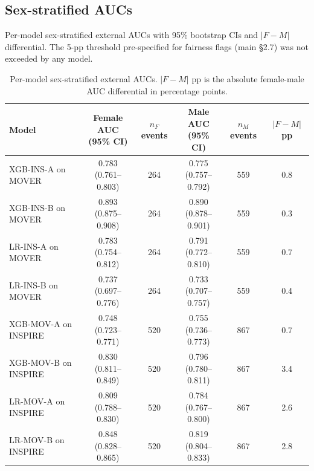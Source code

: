 \documentclass[11pt,a4paper]{article}
\begin{document}
\subsection{Sex-stratified AUCs}\label{supp:s6-sex-stratified}

Per-model sex-stratified external AUCs with 95\% bootstrap CIs and
$|F-M|$ differential. The 5-pp threshold pre-specified for fairness flags
(main \S2.7) was not exceeded by any model.

\begin{table}[H]
\centering
\caption{Per-model sex-stratified external AUCs. $|F-M|$ pp is the absolute
female-male AUC differential in percentage points.}
\label{tab:sensitivities}
\setlength{\tabcolsep}{4pt}
\small
\begin{tabular}{lccccc}
\toprule
\textbf{Model} & \shortstack{\textbf{Female AUC}\\\textbf{(95\% CI)}} & \shortstack{\textbf{$n_F$}\\\textbf{events}} & \shortstack{\textbf{Male AUC}\\\textbf{(95\% CI)}} & \shortstack{\textbf{$n_M$}\\\textbf{events}} & \shortstack{\textbf{$|F\!-\!M|$}\\\textbf{pp}} \\
\midrule
XGB-INS-A on MOVER  & \shortstack{0.783\\(0.761--0.803)} & 264 & \shortstack{0.775\\(0.757--0.792)} & 559 & 0.8 \\
XGB-INS-B on MOVER  & \shortstack{0.893\\(0.875--0.908)} & 264 & \shortstack{0.890\\(0.878--0.901)} & 559 & 0.3 \\
LR-INS-A on MOVER   & \shortstack{0.783\\(0.754--0.812)} & 264 & \shortstack{0.791\\(0.772--0.810)} & 559 & 0.7 \\
LR-INS-B on MOVER   & \shortstack{0.737\\(0.697--0.776)} & 264 & \shortstack{0.733\\(0.707--0.757)} & 559 & 0.4 \\
XGB-MOV-A on INSPIRE & \shortstack{0.748\\(0.723--0.771)} & 520 & \shortstack{0.755\\(0.736--0.773)} & 867 & 0.7 \\
XGB-MOV-B on INSPIRE & \shortstack{0.830\\(0.811--0.849)} & 520 & \shortstack{0.796\\(0.780--0.811)} & 867 & 3.4 \\
LR-MOV-A on INSPIRE  & \shortstack{0.809\\(0.788--0.830)} & 520 & \shortstack{0.784\\(0.767--0.800)} & 867 & 2.6 \\
LR-MOV-B on INSPIRE  & \shortstack{0.848\\(0.828--0.865)} & 520 & \shortstack{0.819\\(0.804--0.833)} & 867 & 2.8 \\
\bottomrule
\end{tabular}
\end{table}
\end{document}
